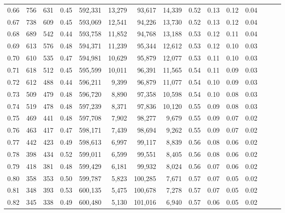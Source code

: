 \begin{tabular}{rrrrrrrrrrrrrrr}
0.66 &     756 &    631 &  0.45 &  592,331 &   13,279 &   93,617 &   14,339 &  0.52 &  0.13 &  0.12 &      0.04 \\
0.67 &     738 &    609 &  0.45 &  593,069 &   12,541 &   94,226 &   13,730 &  0.52 &  0.13 &  0.12 &      0.04 \\
0.68 &     689 &    542 &  0.44 &  593,758 &   11,852 &   94,768 &   13,188 &  0.53 &  0.12 &  0.11 &      0.04 \\
0.69 &     613 &    576 &  0.48 &  594,371 &   11,239 &   95,344 &   12,612 &  0.53 &  0.12 &  0.10 &      0.03 \\
0.70 &     610 &    535 &  0.47 &  594,981 &   10,629 &   95,879 &   12,077 &  0.53 &  0.11 &  0.10 &      0.03 \\
0.71 &     618 &    512 &  0.45 &  595,599 &   10,011 &   96,391 &   11,565 &  0.54 &  0.11 &  0.09 &      0.03 \\
0.72 &     612 &    488 &  0.44 &  596,211 &    9,399 &   96,879 &   11,077 &  0.54 &  0.10 &  0.09 &      0.03 \\
0.73 &     509 &    479 &  0.48 &  596,720 &    8,890 &   97,358 &   10,598 &  0.54 &  0.10 &  0.08 &      0.03 \\
0.74 &     519 &    478 &  0.48 &  597,239 &    8,371 &   97,836 &   10,120 &  0.55 &  0.09 &  0.08 &      0.03 \\
0.75 &     469 &    441 &  0.48 &  597,708 &    7,902 &   98,277 &    9,679 &  0.55 &  0.09 &  0.07 &      0.02 \\
0.76 &     463 &    417 &  0.47 &  598,171 &    7,439 &   98,694 &    9,262 &  0.55 &  0.09 &  0.07 &      0.02 \\
0.77 &     442 &    423 &  0.49 &  598,613 &    6,997 &   99,117 &    8,839 &  0.56 &  0.08 &  0.06 &      0.02 \\
0.78 &     398 &    434 &  0.52 &  599,011 &    6,599 &   99,551 &    8,405 &  0.56 &  0.08 &  0.06 &      0.02 \\
0.79 &     418 &    381 &  0.48 &  599,429 &    6,181 &   99,932 &    8,024 &  0.56 &  0.07 &  0.06 &      0.02 \\
0.80 &     358 &    353 &  0.50 &  599,787 &    5,823 &  100,285 &    7,671 &  0.57 &  0.07 &  0.05 &      0.02 \\
0.81 &     348 &    393 &  0.53 &  600,135 &    5,475 &  100,678 &    7,278 &  0.57 &  0.07 &  0.05 &      0.02 \\
0.82 &     345 &    338 &  0.49 &  600,480 &    5,130 &  101,016 &    6,940 &  0.57 &  0.06 &  0.05 &      0.02 \\

\end{tabular}
